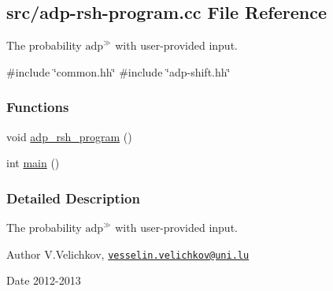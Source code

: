 \hypertarget{adp-rsh-program_8cc}{\subsection{src/adp-\/rsh-\/program.cc \-File \-Reference}
\label{adp-rsh-program_8cc}
}


\-The probability $\mathrm{adp}^{\gg}$ with user-\/provided input.  


{\ttfamily \#include \char`\"{}common.\-hh\char`\"{}}\*
{\ttfamily \#include \char`\"{}adp-\/shift.\-hh\char`\"{}}\*
\subsubsection*{\-Functions}
\begin{DoxyCompactItemize}
\item 
void \hyperlink{adp-rsh-program_8cc_a0c77cef1f9ec582bb6d59dd9c2259ec3}{adp\-\_\-rsh\-\_\-program} ()
\item 
int \hyperlink{adp-rsh-program_8cc_ae66f6b31b5ad750f1fe042a706a4e3d4}{main} ()
\end{DoxyCompactItemize}


\subsubsection{\-Detailed \-Description}
\-The probability $\mathrm{adp}^{\gg}$ with user-\/provided input. \begin{DoxyAuthor}{\-Author}
\-V.\-Velichkov, \href{mailto:vesselin.velichkov@uni.lu}{\tt vesselin.\-velichkov@uni.\-lu} 
\end{DoxyAuthor}
\begin{DoxyDate}{\-Date}
2012-\/2013 
\end{DoxyDate}


